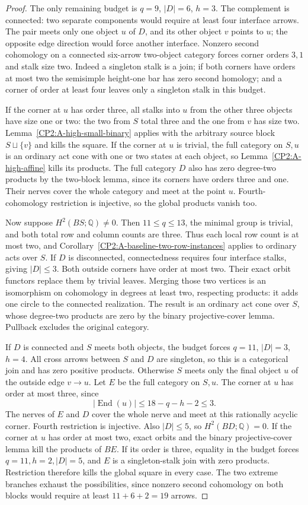 \begin{proof}
The only remaining budget is $q=9$, $|D|=6$, $h=3$.
The complement is connected: two separate components would
require at least four interface arrows. The pair meets only
one object $u$ of $D$, and its other object $v$ points to $u$;
the opposite edge direction would force another interface.
Nonzero second cohomology on a connected six-arrow two-object
category forces corner orders $3,1$ and stalk size two.
Indeed a singleton stalk is a join; if both corners have
orders at most two the semisimple height-one bar has zero
second homology; and a corner of order at least four leaves
only a singleton stalk in this budget.

If the corner at $u$ has order three, all stalks into $u$
from the other three objects have size one or two: the two
from $S$ total three and the one from $v$ has size two.
Lemma~\ref{CP2:A-high-small-binary} applies with the arbitrary
source block $S\sqcup\{v\}$ and kills the square. If the
corner at $u$ is trivial, the full category on $S,u$ is an
ordinary act cone with one or two states at each object,
so Lemma~\ref{CP2:A-high-affine} kills its products. The
full category $D$ also has zero degree-two products by the
two-block lemma, since its corners have orders three and one.
Their nerves cover the whole category and meet at the point
$u$. Fourth-cohomology restriction is injective, so the
global products vanish too.

Now suppose $H^2(BS;\mathbb Q)\ne0$. Then $11\le q\le13$,
the minimal group is trivial, and both total row and column
counts are three. Thus each local row count is at most two,
and Corollary~\ref{CP2:A-baseline-two-row-instances} applies
to ordinary acts over $S$.
If $D$ is disconnected, connectedness requires four interface
stalks, giving $|D|\le3$. Both outside corners have order at
most two. Their exact orbit functors replace them by trivial
leaves. Merging those two vertices is an isomorphism on
cohomology in degrees at least two, respecting products: it
adds one circle to the connected realization. The result is
an ordinary act cone over $S$, whose degree-two products are
zero by the binary projective-cover lemma. Pullback excludes
the original category.

If $D$ is connected and $S$ meets both objects, the budget
forces $q=11$, $|D|=3$, $h=4$. All cross arrows between
$S$ and $D$ are singleton, so this is a categorical join
and has zero positive products. Otherwise $S$ meets only
the final object $u$ of the outside edge $v\to u$. Let $E$
be the full category on $S,u$. The corner at $u$ has order
at most three, since
\[
 |\operatorname{End}(u)|\le18-q-h-2\le3.
\]
The nerves of $E$ and $D$ cover the whole nerve and meet
at this rationally acyclic corner. Fourth restriction is
injective. Also $|D|\le5$, so $H^2(BD;\mathbb Q)=0$.
If the corner at $u$ has order at most two, exact orbits
and the binary projective-cover lemma kill the products
of $BE$. If its order is three, equality in the budget
forces $q=11,h=2,|D|=5$, and $E$ is a singleton-stalk
join with zero products. Restriction therefore kills the
global square in every case. The two extreme branches
exhaust the possibilities, since nonzero second cohomology
on both blocks would require at least $11+6+2=19$ arrows.


\end{proof}
